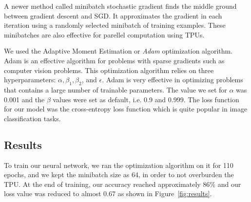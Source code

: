 \documentclass[11pt]{article}
\begin{document}
  A newer method called minibatch stochastic gradient finds the middle ground between 
  gradient descent and SGD. It approximates the gradient in each iteration using a randomly 
  selected minibatch of training examples. These minibatches are also effective for 
  parellel computation using TPUs. 

  We used the Adaptive Moment Estimation or \textit{Adam} optimization algorithm. Adam is an 
  effective algorithm for problems with sparse gradients such as computer vision problems. 
  This optimization algorithm relies on three hyperparameters: $\alpha, \beta_1, \beta_2 $, and $\epsilon$.
  Adam is very effective in optimizing problems that contains a large number 
  of trainable parameters. The value we set for $\alpha$ was 0.001 and the $\beta$ values 
  were set as default, i.e. 0.9 and 0.999. The loss function for our model was 
  the cross-entropy loss function which is quite popular in image classification tasks.
   
  \subsection{Results}
  To train our neural network, we ran the optimization algorithm on it for 
  110 epochs, and we kept the minibatch size as 64, in order to not overburden the TPU.
  At the end of training, our accuracy reached approximately 86\% and our loss value 
  was reduced to almost 0.67 as shown in Figure~\ref{fig:results}.
\end{document}
